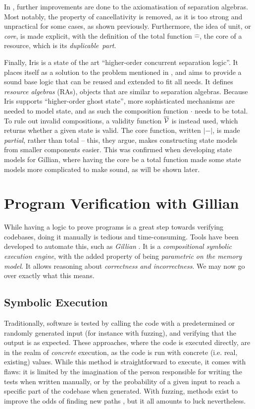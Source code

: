 In \cite{statesoundness}, further improvements are done to the axiomatisation of separation algebras. Most notably, the property of cancellativity is removed, as it is too strong and unpractical for some cases, as shown previously. Furthermore, the idea of unit, or \emph{core}, is made explicit, with the definition of the total function $\hat-$, the core of a resource, which is its \emph{duplicable~part}.

Finally, Iris \cite{iris} is a state of the art ``higher-order concurrent separation logic''. It places itself as a solution to the problem mentioned in \cite{next700seplogics}, and aims to provide a sound base logic that can be reused and extended to fit all needs. It defines \emph{resource algebras} (RAs), objects that are similar to separation algebras. Because Iris supports ``higher-order ghost state'', more sophisticated mechanisms are needed to model state, and as such the composition function $\cdot$ needs to be total. To rule out invalid compositions, a validity function $\overline{\cal V}$ is instead used, which returns whether a given state is valid. The core function, written $|-|$, is made \emph{partial}, rather than total -- this, they argue, makes constructing state models from smaller components easier. This was confirmed when developing state models for Gillian, where having the core be a total function made some state models more complicated to make sound, as will be shown later.

\section{Program Verification with Gillian}

While having a logic to prove programs is a great step towards verifying codebases, doing it manually is tedious and time-consuming. Tools have been developed to automate this, such as \emph{Gillian} \cite{gillian0, gillian1, gillian2}. It is a \emph{compositional symbolic execution engine}, with the added property of being \emph{parametric on the memory model}. It allows reasoning about \emph{correctness and incorrectness}. We may now go over exactly what this means.

\subsection{Symbolic Execution}

Traditionally, software is tested by calling the code with a predetermined or randomly generated input (for instance with fuzzing), and verifying that the output is as expected. These approaches, where the code is executed directly, are in the realm of \emph{concrete} execution, as the code is run with concrete (i.e. real, existing) values. While this method is straightforward to execute, it comes with flaws: it is limited by the imagination of the person responsible for writing the tests when written manually, or by the probability of a given input to reach a specific part of the codebase when generated. With fuzzing, methods exist to improve the odds of finding new paths \cite{smartfuzzing}, but it all amounts to luck nevertheless.

